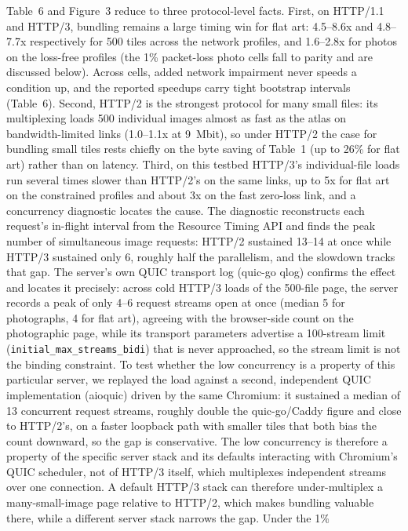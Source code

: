 \documentclass[3p,twocolumn]{elsarticle}
\begin{document}
Table~6 and Figure~3 reduce to three protocol-level facts. First, on
HTTP/1.1 and HTTP/3, bundling remains a large timing win for flat art:
4.5--8.6x and 4.8--7.7x respectively for 500 tiles across the network
profiles, and 1.6--2.8x for photos on the loss-free profiles (the 1\%
packet-loss photo cells fall to parity and are discussed below). Across
cells, added network impairment never speeds a condition up, and the
reported speedups carry tight bootstrap intervals (Table~6). Second,
HTTP/2 is the strongest protocol for many small files: its multiplexing
loads 500 individual images almost as fast as the atlas on
bandwidth-limited links (1.0--1.1x at 9~Mbit), so under HTTP/2 the case
for bundling small tiles rests chiefly on the byte saving of Table~1 (up
to 26\% for flat art) rather than on latency. Third, on this testbed
HTTP/3's individual-file loads run several times slower
than HTTP/2's on the same links, up to 5x for flat art
on the constrained profiles and about 3x on the fast zero-loss link, and
a concurrency diagnostic locates the cause. The diagnostic reconstructs
each request's in-flight interval from the Resource
Timing API and finds the peak number of simultaneous image requests:
HTTP/2 sustained 13--14 at once while HTTP/3 sustained only 6, roughly
half the parallelism, and the slowdown tracks that gap. The
server's own QUIC transport log (quic-go qlog) confirms
the effect and locates it precisely: across cold HTTP/3 loads of the
500-file page, the server records a peak of only 4--6 request streams
open at once (median 5 for photographs, 4 for flat art), agreeing with
the browser-side count on the photographic page, while its transport
parameters advertise a 100-stream limit
(\texttt{initial\_max\_streams\_bidi}) that is never approached, so the
stream limit is not the binding constraint. To test whether the low
concurrency is a property of this particular server, we replayed the
load against a second, independent QUIC implementation (aioquic) driven
by the same Chromium: it sustained a median of 13 concurrent request
streams, roughly double the quic-go/Caddy figure and close to
HTTP/2's, on a faster loopback path with smaller tiles
that both bias the count downward, so the gap is conservative. The low
concurrency is therefore a property of the specific server stack and its
defaults interacting with Chromium's QUIC scheduler, not
of HTTP/3 itself, which multiplexes independent streams over one
connection. A default HTTP/3 stack can therefore under-multiplex a
many-small-image page relative to HTTP/2, which makes bundling valuable
there, while a different server stack narrows the gap. Under the 1\%
\end{document}

